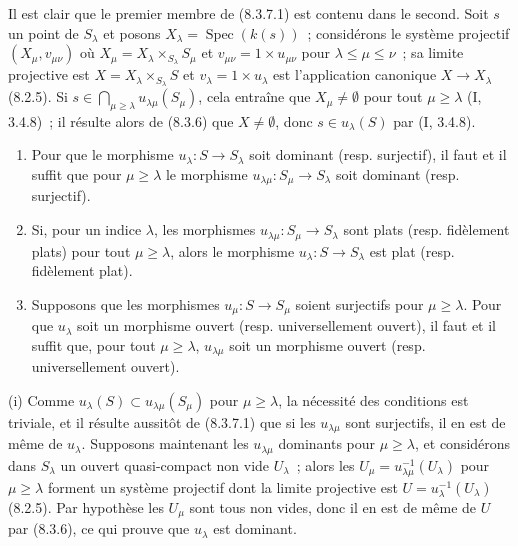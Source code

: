 Il est clair que le premier membre de (8.3.7.1) est contenu dans le second.
Soit $s$ un point de $S_\lambda$ et posons
$X_\lambda=\operatorname{Spec}(k(s))$~; considérons le système projectif
$(X_\mu,v_{\mu\nu})$ où
$X_\mu=X_\lambda\times_{S_\lambda}S_\mu$ et
$v_{\mu\nu}=1\times u_{\mu\nu}$ pour
$\lambda\leq\mu\leq\nu$~; sa limite projective est
$X=X_\lambda\times_{S_\lambda}S$ et $v_\lambda=1\times u_\lambda$ est
l'application canonique $X\to X_\lambda$ (8.2.5). Si
$s\in\bigcap_{\mu\geq\lambda}u_{\lambda\mu}(S_\mu)$, cela entraîne que
$X_\mu\neq\emptyset$ pour tout $\mu\geq\lambda$ (I, 3.4.8)~; il résulte
alors de (8.3.6) que $X\neq\emptyset$, donc $s\in u_\lambda(S)$ par
(I, 3.4.8).

\begin{proposition}[8.3.8]
\label{IV.8.3.8-fr}
\begin{enumerate}
\item[(i)] Pour que le morphisme $u_\lambda:S\to S_\lambda$ soit dominant
(resp. surjectif), il faut et il suffit que pour $\mu\geq\lambda$ le
morphisme $u_{\lambda\mu}:S_\mu\to S_\lambda$ soit dominant (resp.
surjectif).
\item[(ii)] Si, pour un indice $\lambda$, les morphismes
$u_{\lambda\mu}:S_\mu\to S_\lambda$ sont plats (resp. fidèlement plats)
pour tout $\mu\geq\lambda$, alors le morphisme
$u_\lambda:S\to S_\lambda$ est plat (resp. fidèlement plat).
\item[(iii)] Supposons que les morphismes $u_\mu:S\to S_\mu$ soient
surjectifs pour $\mu\geq\lambda$. Pour que $u_\lambda$ soit un morphisme
ouvert (resp. universellement ouvert), il faut et il suffit que, pour tout
$\mu\geq\lambda$, $u_{\lambda\mu}$ soit un morphisme ouvert (resp.
universellement ouvert).
\end{enumerate}
\end{proposition}

\noindent
(i) Comme $u_\lambda(S)\subset u_{\lambda\mu}(S_\mu)$ pour
$\mu\geq\lambda$, la nécessité des conditions est triviale, et il résulte
aussitôt de (8.3.7.1) que si les $u_{\lambda\mu}$ sont surjectifs, il en est
de même de $u_\lambda$. Supposons maintenant les $u_{\lambda\mu}$ dominants
pour $\mu\geq\lambda$, et considérons dans $S_\lambda$ un ouvert
quasi-compact non vide $U_\lambda$~; alors les
$U_\mu=u_{\lambda\mu}^{-1}(U_\lambda)$ pour $\mu\geq\lambda$ forment un
système projectif dont la limite projective est
$U=u_\lambda^{-1}(U_\lambda)$ (8.2.5). Par hypothèse les $U_\mu$ sont tous
non vides, donc il en est de même de $U$ par (8.3.6), ce qui prouve que
$u_\lambda$ est dominant.

